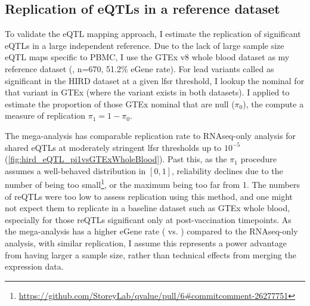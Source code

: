 \subsection{Replication of eQTLs in a reference dataset}

To validate the \gls{eQTL} mapping approach, I estimate the replication of significant eQTLs in a large independent reference.
Due to the lack of large sample size \gls{eQTL} maps specific to \gls{PBMC}, I use the GTEx v8 whole blood dataset as my reference dataset (\autocite{thegtexconsortium2020GTExConsortiumAtlas}, n=670, 51.2\% eGene rate).
For lead variants called as significant in the \gls{HIRD} dataset at a given lfsr threshold, I lookup the nominal \pvalue{} for that variant in GTEx (where the variant exists in both datasets).
I applied  to estimate the proportion of those GTEx nominal \pvalues{} that are null ($\pi_0$), the compute a measure of replication $\pi_1 = 1 - \pi_0$.

The mega-analysis has comparable replication rate to \gls{RNAseq}-only analysis for shared \glspl{eQTL} at moderately stringent \gls{lfsr} thresholds up to $10^{-5}$ (\cref{fig:hird_eQTL_pi1vsGTExWholeBlood}).
Past this, as the $\pi_1$ procedure assumes a well-behaved \pvalue distribution in $\left[0, 1\right]$, 
reliability declines due to the number of \pvalues{} being too small\footnote{\url{https://github.com/StoreyLab/qvalue/pull/6\#commitcomment-26277751}}, or the maximum \pvalue{} being too far from 1.
The numbers of \glspl{reQTL} were too low to assess replication using this method, and one might not expect them to replicate in a baseline dataset such as GTEx whole blood, especially for those \glspl{reQTL} significant only at post-vaccination timepoints.
As the mega-analysis has a higher eGene rate ( vs. ) compared to the \gls{RNAseq}-only analysis, with similar replication,
I assume this represents a power advantage from having larger a sample size, rather than technical effects from merging the expression data.

